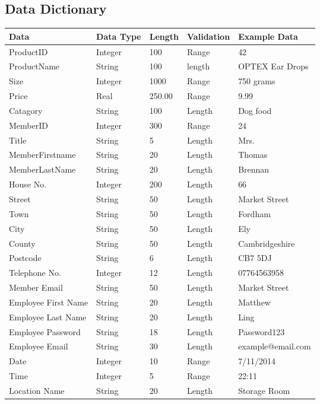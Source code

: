 \begin{python}
\subsection{Data Dictionary}

    \begin{tabular}{|p{3cm}|p{2cm}|p{1.2cm}|p{2cm}|p{3cm}|}
        \hline
        \textbf{Data} & \textbf{Data Type} & \textbf{Length} & \textbf{Validation} & \textbf{Example Data}\\ \hline
	ProductID & Integer & 100 & Range & 42 \\ \hline
	ProductName & String & 100 & length & OPTEX Ear Drops \\ \hline
	Size & Integer & 1000 & Range & 750 grams \\ \hline
          Price & Real & 250.00 & Range & 9.99 \\ \hline
          Catagory & String & 100 & Length & Dog food \\ \hline
          MemberID & Integer & 300 & Range & 24 \\ \hline
	Title & String & 5 & Length & Mrs. \\ \hline
          MemberFirstname & String & 20 & Length & Thomas \\ \hline
          MemberLastName & String & 20 & Length & Brennan \\ \hline
          House No. & Integer & 200 & Length & 66 \\ \hline
	Street & String & 50 & Length & Market Street \\ \hline
	Town & String & 50 & Length & Fordham \\ \hline
         City & String & 50 & Length & Ely \\ \hline
         County & String & 50 & Length & Cambridgeshire \\ \hline
         Postcode & String & 6 & Length & CB7 5DJ \\ \hline
         Telephone No. & Integer & 12 & Length & 07764563958 \\ \hline
	Member Email & String & 50 & Length & Market Street \\ \hline
	Employee First Name & String & 20 & Length & Matthew \\ \hline
	Employee Last Name & String & 20 & Length & Ling \\ \hline
	Employee Password & String & 18 & Length & Password123 \\ \hline
	Employee Email & String & 30 & Length & example@email.com \\ \hline
	Date & Integer & 10 & Range & 7/11/2014 \\ \hline
	Time & Integer & 5 & Range & 22:11 \\ \hline
	Location Name & String & 20 & Length & Storage Room \\ \hline
  \end{tabular}


\end{python}
